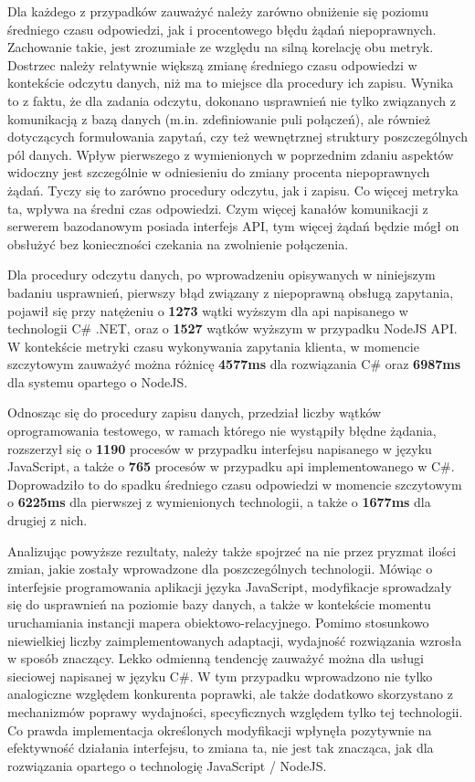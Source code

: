 Dla każdego z przypadków zauważyć należy zarówno obniżenie się poziomu średniego czasu odpowiedzi, jak i procentowego błędu żądań niepoprawnych. Zachowanie takie, jest zrozumiałe ze względu na silną korelację obu metryk. Dostrzec należy relatywnie większą zmianę średniego czasu odpowiedzi w kontekście odczytu danych, niż ma to miejsce dla procedury ich zapisu. Wynika to z faktu, że dla zadania odczytu, dokonano usprawnień nie tylko związanych z komunikacją z bazą danych (m.in. zdefiniowanie puli połączeń), ale również dotyczących formułowania zapytań, czy też wewnętrznej struktury poszczególnych pól danych. Wpływ pierwszego z wymienionych w poprzednim zdaniu aspektów widoczny jest szczególnie w odniesieniu do zmiany procenta niepoprawnych żądań. Tyczy się to zarówno procedury odczytu, jak i zapisu. Co więcej metryka ta, wpływa na średni czas odpowiedzi. Czym więcej kanałów komunikacji z serwerem bazodanowym posiada interfejs API, tym więcej żądań będzie mógł on obsłużyć bez konieczności czekania na zwolnienie połączenia.

Dla procedury odczytu danych, po wprowadzeniu opisywanych w niniejszym badaniu usprawnień, pierwszy błąd związany z niepoprawną obsługą zapytania, pojawił się przy natężeniu o \textbf{1273} wątki wyższym dla api napisanego w technologii C\# .NET, oraz o \textbf{1527} wątków wyższym w przypadku NodeJS API. W kontekście metryki czasu wykonywania zapytania klienta, w momencie szczytowym zauważyć można różnicę \textbf{4577ms} dla rozwiązania C\# oraz \textbf{6987ms} dla systemu opartego o NodeJS.

Odnosząc się do procedury zapisu danych, przedział liczby wątków oprogramowania testowego, w ramach którego nie wystąpiły błędne żądania, rozszerzył się o \textbf{1190} procesów w przypadku interfejsu napisanego w języku JavaScript, a także o \textbf{765} procesów w przypadku api implementowanego w C\#. Doprowadziło to do spadku średniego czasu odpowiedzi w momencie szczytowym o \textbf{6225ms} dla pierwszej z wymienionych technologii, a także o \textbf{1677ms} dla drugiej z nich.

Analizując powyższe rezultaty, należy także spojrzeć na nie przez pryzmat ilości zmian, jakie zostały wprowadzone dla poszczególnych technologii. Mówiąc o interfejsie programowania aplikacji języka JavaScript, modyfikacje sprowadzały się do usprawnień na poziomie bazy danych, a także w kontekście momentu uruchamiania instancji mapera obiektowo-relacyjnego. Pomimo stosunkowo niewielkiej liczby zaimplementowanych adaptacji, wydajność rozwiązania wzrosła w sposób znaczący. Lekko odmienną tendencję zauważyć można dla usługi sieciowej napisanej w języku C\#. W tym przypadku wprowadzono nie tylko analogiczne względem konkurenta poprawki, ale także dodatkowo skorzystano z mechanizmów poprawy wydajności, specyficznych względem tylko tej technologii. Co prawda implementacja określonych modyfikacji wpłynęła pozytywnie na efektywność działania interfejsu, to zmiana ta, nie jest tak znacząca, jak dla rozwiązania opartego o technologię JavaScript / NodeJS. 
